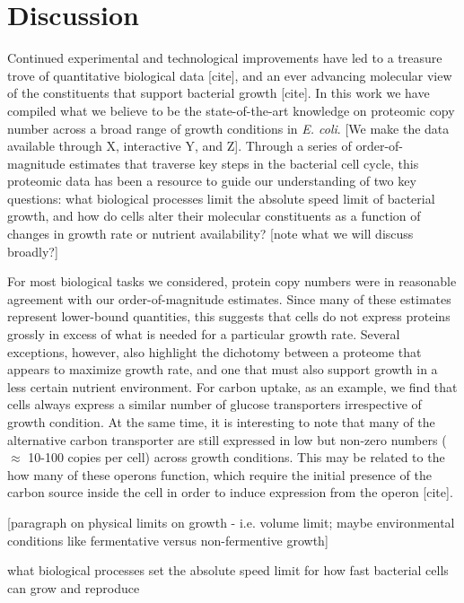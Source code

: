 \section{Discussion}
Continued experimental and technological improvements have led to a treasure
trove of quantitative biological data [cite], and an ever advancing molecular
view of the constituents that support bacterial growth [cite]. In this work we
have compiled what we believe to be the state-of-the-art knowledge on proteomic
copy number across a broad range of growth conditions in \textit{E. coli}. [We
make the data available through X, interactive Y, and Z]. Through a series of
order-of-magnitude estimates that traverse key steps in the bacterial cell
cycle, this proteomic data has been a resource to guide our understanding of two
key questions: what biological processes limit the absolute speed limit of
bacterial growth, and how do cells alter their  molecular constituents as a
function of changes in growth rate or nutrient availability?
[note what we will discuss broadly?]

For most biological tasks we considered, protein copy numbers were in reasonable
agreement with our order-of-magnitude estimates. Since many of these estimates
represent lower-bound quantities, this suggests that cells do not express
proteins grossly in excess of what is needed for a particular growth rate.
Several exceptions, however, also highlight the dichotomy between a proteome
that appears to maximize growth rate, and one that must also support growth in a
less certain nutrient environment. For carbon uptake, as an example, we find
that cells always express a similar number of glucose transporters irrespective
of growth condition. At the same time, it is interesting to note that many of
the alternative carbon transporter are still expressed in low but non-zero
numbers ($\approx$ 10-100 copies per cell) across growth conditions. This may be
related to the how many of these operons function, which require the initial
presence of the carbon source inside the cell in order to induce expression from
the operon [cite].

[paragraph on physical limits on growth - i.e. volume limit; maybe environmental
conditions like fermentative versus non-fermentive growth]

what biological
processes set the absolute speed limit for how fast bacterial cells can grow and
reproduce


